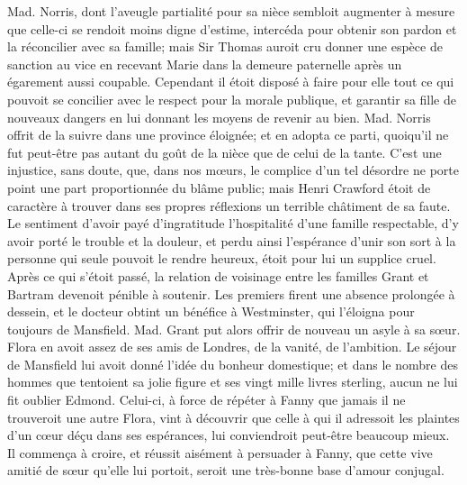 Mad. Norris, dont l'aveugle partialité pour sa nièce sembloit augmenter à mesure que celle-ci se rendoit moins digne d'estime, intercéda pour obtenir son pardon et la réconcilier avec sa famille; mais Sir Thomas auroit cru donner une espèce de sanction au vice en recevant Marie dans la demeure paternelle après un égarement aussi coupable. Cependant il étoit disposé à faire pour elle tout ce qui pouvoit se concilier avec le respect pour la morale publique, et garantir sa fille de nouveaux dangers en lui donnant les moyens de revenir au bien. Mad. Norris offrit de la suivre dans une province éloignée;\setcounter{page}{407} et en adopta ce parti, quoiqu'il ne fut peut-être pas autant du goût de la nièce que de celui de la tante.
C'est une injustice, sans doute, que, dans nos mœurs, le complice d'un tel désordre ne porte point une part proportionnée du blâme public; mais Henri Crawford étoit de caractère à trouver dans ses propres réflexions un terrible châtiment de sa faute. Le sentiment d'avoir payé d'ingratitude l'hospitalité d'une famille respectable, d'y avoir porté le trouble et la douleur, et perdu ainsi l'espérance d'unir son sort à la personne qui seule pouvoit le rendre heureux, étoit pour lui un supplice cruel.
Après ce qui s'étoit passé, la relation de voisinage entre les familles Grant et Bartram devenoit pénible à soutenir. Les premiers firent une absence prolongée à dessein, et le docteur obtint un bénéfice à Westminster, qui l'éloigna pour toujours de Mansfield. Mad. Grant put alors offrir de nouveau un asyle à sa sœur. Flora en avoit assez de ses amis de Londres, de la vanité, de l'ambition. Le séjour de Mansfield lui avoit donné l'idée du bonheur domestique; et dans le nombre des hommes que tentoient sa jolie figure et ses vingt mille livres sterling,\setcounter{page}{408} aucun ne lui fit oublier Edmond. Celui-ci, à force de répéter à Fanny que jamais il ne trouveroit une autre Flora, vint à découvrir que celle à qui il adressoit les plaintes d'un cœur déçu dans ses espérances, lui conviendroit peut-être beaucoup mieux. Il commença à croire, et réussit aisément à persuader à Fanny, que cette vive amitié de sœur qu'elle lui portoit, seroit une très-bonne base d'amour conjugal.